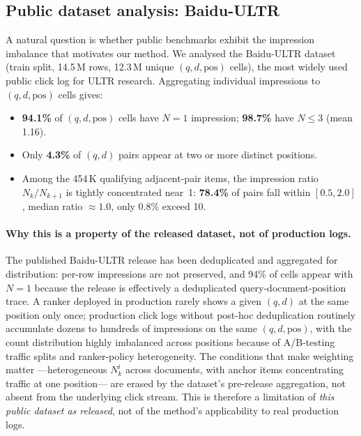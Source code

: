 \documentclass[sigconf]{acmart}
\begin{document}
\subsection{Public dataset analysis: Baidu-ULTR}
\label{sec:baidu}

A natural question is whether public benchmarks exhibit the impression imbalance that motivates
our method. We analysed the Baidu-ULTR dataset \cite{zou2022large} (train split, 14.5\,M rows,
12.3\,M unique $(q,d,\mathrm{pos})$ cells), the most widely used public click log for ULTR
research. Aggregating individual impressions to $(q, d, \mathrm{pos})$ cells gives:

\begin{itemize}
  \item \textbf{94.1\%} of $(q, d, \mathrm{pos})$ cells have $N = 1$ impression; \textbf{98.7\%}
    have $N \leq 3$ (mean 1.16).
  \item Only \textbf{4.3\%} of $(q, d)$ pairs appear at two or more distinct positions.
  \item Among the 454\,K qualifying adjacent-pair items, the impression ratio $N_k / N_{k+1}$
    is tightly concentrated near~1: \textbf{78.4\%} of pairs fall within $[0.5, 2.0]$, median
    ratio $\approx 1.0$, only 0.8\% exceed 10.
\end{itemize}

\paragraph{Why this is a property of the released dataset, not of production logs.}
The published Baidu-ULTR release has been deduplicated and aggregated for distribution: per-row
impressions are not preserved, and 94\% of cells appear with $N=1$ because the release is
effectively a deduplicated query-document-position trace. A ranker deployed in production rarely
shows a given $(q,d)$ at the same position only once; production click logs without
post-hoc deduplication routinely accumulate dozens to hundreds of impressions on the same
$(q,d,\mathrm{pos})$, with the count distribution highly imbalanced across positions because
of A/B-testing traffic splits and ranker-policy heterogeneity. The conditions that make
weighting matter ---heterogeneous $N_k^i$ across documents, with anchor items concentrating
traffic at one position--- are erased by the dataset's pre-release aggregation, not absent
from the underlying click stream. This is therefore a limitation of \emph{this public dataset
as released}, not of the method's applicability to real production logs.
\end{document}
